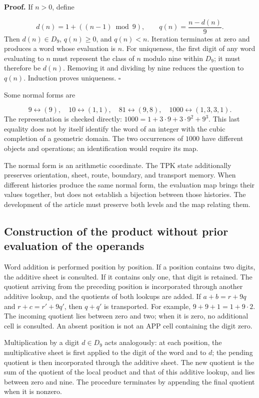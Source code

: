 \textbf{Proof.} If $n>0$, define

\[
d(n)=1+((n-1)\bmod9),\qquad q(n)=\frac{n-d(n)}9.
\]
Then $d(n)\in D_9$, $q(n)\ge0$, and $q(n)<n$. Iteration terminates at zero and produces a word whose evaluation is $n$. For uniqueness, the first digit of any word evaluating to $n$ must represent the class of $n$ modulo nine within $D_9$; it must therefore be $d(n)$. Removing it and dividing by nine reduces the question to $q(n)$. Induction proves uniqueness. \hfill\(\square\)

Some normal forms are

\[
9\leftrightarrow(9),\quad
10\leftrightarrow(1,1),\quad
81\leftrightarrow(9,8),\quad
1000\leftrightarrow(1,3,3,1).
\]
The representation is checked directly: $1000=1+3\cdot9+3\cdot9^2+9^3$. This last equality does not by itself identify the word of an integer with the cubic completion of a geometric domain. The two occurrences of $1000$ have different objects and operations; an identification would require its map.

The normal form is an arithmetic coordinate. The TPK state additionally preserves orientation, sheet, route, boundary, and transport memory. When different histories produce the same normal form, the evaluation map brings their values together, but does not establish a bijection between those histories. The development of the article must preserve both levels and the map relating them.

\subsection{Construction of the product without prior evaluation of the operands}
Word addition is performed position by position. If a position contains two digits, the additive sheet is consulted. If it contains only one, that digit is retained. The quotient arriving from the preceding position is incorporated through another additive lookup, and the quotients of both lookups are added. If \(a+b=r+9q\) and \(r+c=r'+9q'\), then \(q+q'\) is transported. For example, \(9+9+1=1+9\cdot2\). The incoming quotient lies between zero and two; when it is zero, no additional cell is consulted. An absent position is not an APP cell containing the digit zero.

Multiplication by a digit $d\in D_9$ acts analogously: at each position, the multiplicative sheet is first applied to the digit of the word and to $d$; the pending quotient is then incorporated through the additive sheet. The new quotient is the sum of the quotient of the local product and that of this additive lookup, and lies between zero and nine. The procedure terminates by appending the final quotient when it is nonzero.

